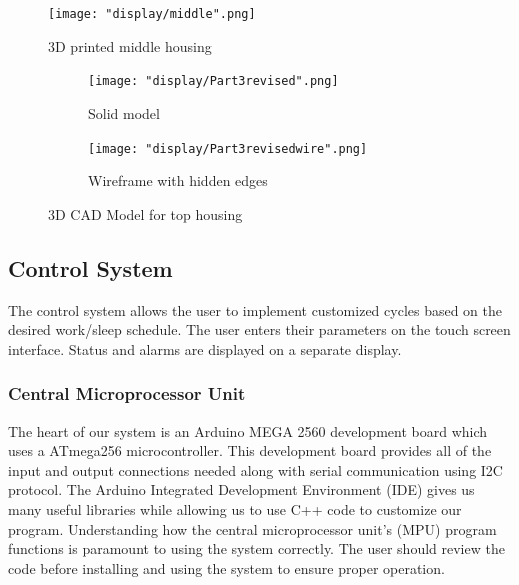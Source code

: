 \documentclass[12pt,a4paper]{report}
\begin{document}
\begin{figure}[H]
	\centering
	\texttt{[image: "display/middle".png]}\par			
	\vspace{0.1cm}
	\caption{3D printed middle housing}
\end{figure}
\begin{figure}[H]
\centering
\begin{subfigure}{.5\textwidth}
  \centering
  \texttt{[image: "display/Part3revised".png]}
  \caption{Solid model}
  \label{fig:sub1}
\end{subfigure}%
\begin{subfigure}{.5\textwidth}
  \centering
  \texttt{[image: "display/Part3revisedwire".png]}
  \caption{Wireframe with hidden edges}
  \label{fig:sub2}
\end{subfigure}
\caption{3D CAD Model for top housing}
\label{fig:test}

\end{figure}


\subsection{Control System}
The control system allows the user to implement customized cycles based on the desired work/sleep schedule. The user enters their parameters on the touch screen interface. Status and alarms are displayed on a separate display. 
\subsubsection{Central Microprocessor Unit}
The heart of our system is an Arduino MEGA 2560 development board which uses a ATmega256 microcontroller. This development board provides all of the input and output connections needed along with serial communication using I2C protocol. The Arduino Integrated Development Environment (IDE) gives us many useful libraries while allowing us to use C++ code to customize our program. Understanding how the central microprocessor unit's (MPU) program functions is paramount to using the system correctly. The user should review the code before installing and using the system to ensure proper operation. 


\end{document}
